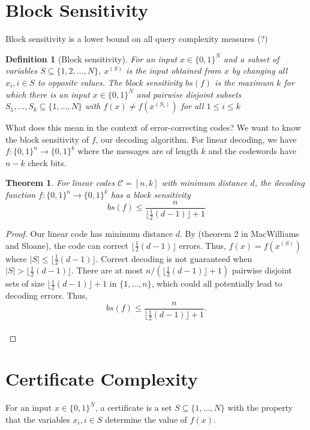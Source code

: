 \documentclass[12pt]{article}
\author{Marika Swanberg}
\newtheorem{theorem}{Theorem}
\newtheorem{definition}{Definition}
\begin{document}
\section{Block Sensitivity} 
Block sensitivity is a lower bound on all query complexity measures (?)

\begin{definition}[Block sensitivity] For an input $x\in \{0,1\}^N$ and a subset of variables $S \subseteq \{1, 2, \ldots, N\}$, $x^{(S)}$ is the input obtained from $x$ by changing all $x_i, i \in S$ to opposite values. The block sensitivity $bs(f)$ is the maximum $k$ for which there is an input $x \in \{0,1\}^N$ and pairwise disjoint subsets $S_1, \ldots, S_k \subseteq \{1, \ldots, N\}$ with $f(x) \neq f(x^{(S_i)})$ for all $1 \leq i \leq k$
\end{definition}

What does this mean in the context of error-correcting codes? We want to know the block sensitivity of $f$, our decoding algorithm. For linear decoding, we have $f: \{0,1\}^n \rightarrow \{0,1\}^k$ where the messages are of length $k$ and the codewords have $n-k$ check bits. 

\begin{theorem}
For linear codes $\mathscr{C} = [n,k]$ with minimum distance $d$, the decoding function $f: \{0,1\}^n \rightarrow \{0,1\}^k$ has a block sensitivity $$
bs(f) \leq \frac{n}{\lfloor \frac{1}{2}(d-1)  \rfloor +1}$$
\end{theorem}

\begin{proof}
Our linear code has minimum distance $d$. By (theorem 2 in MacWilliams and Sloane), the code can correct $\lfloor \frac{1}{2}(d-1) \rfloor$ errors. Thus, $f(x) = f(x^{(S)})$ where $\lvert S \rvert \leq \lfloor \frac{1}{2}(d-1) \rfloor$. Correct decoding is not guaranteed when $\lvert S \rvert > \lfloor \frac{1}{2}(d-1) \rfloor$. There are at most $n/(\lfloor \frac{1}{2}(d-1) \rfloor +1)$ pairwise disjoint sets of size $\lfloor \frac{1}{2}(d-1) \rfloor+ 1$ in $\{1, \ldots, n\}$, which could all potentially lead to decoding errors. Thus, $$bs(f) \leq \frac{n}{\lfloor \frac{1}{2}(d-1)  \rfloor +1}.$$\\
\end{proof}

\section{Certificate Complexity}

For an input $x \in \{0,1\}^N$, a certificate is a set $S \subseteq \{1, \ldots, N\}$ with the property that the variables $x_i, i \in S$ determine the value of $f(x)$. 
 
\end{document}
